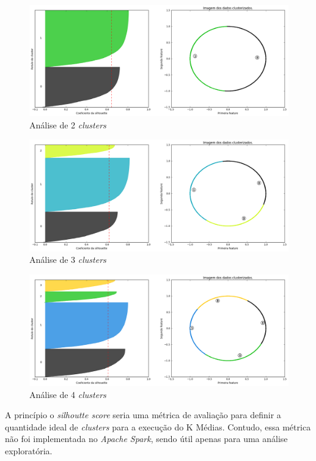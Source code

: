 \begin{anexosenv}
\begin{figure}[!ht]
\caption{An\'alise de 2 \emph{clusters} }
\centerline{\includegraphics[width=.85\textwidth]{img/silhoute2}}
\end{figure}

\begin{figure}[!ht]
\caption{An\'alise de 3 \emph{clusters} }
\centerline{\includegraphics[width=.85\textwidth]{img/silhoute3}}
\end{figure}


\begin{figure}[!ht]
\caption{An\'alise de 4 \emph{clusters} }
\centerline{\includegraphics[width=.85\textwidth]{img/silhoute4}}
\end{figure}

A princípio o \emph{silhoutte score} seria uma métrica de avaliação para definir a quantidade ideal de \emph{clusters} para a execução do K Médias. Contudo, essa métrica não foi implementada no \emph{Apache Spark}, sendo útil apenas para uma análise exploratória.


\end{anexosenv}
